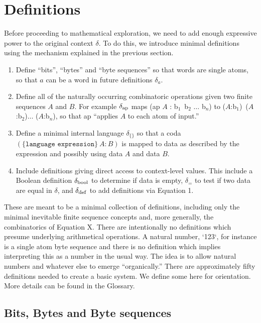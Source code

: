 \documentclass[11pt]{article}
\begin{document}
\section{Definitions}

     Before proceeding to mathematical exploration, we need to add enough expressive power to the original context $\delta$.  To do this, 
we introduce minimal definitions using the mechanism explained in the previous section.  

\begin{enumerate}
\item {Define ``bits'', ``bytes'' and ``byte sequences'' so that words are single atoms, so that $a$ can be a word in future definitions $\delta_a$.}
\item {Define all of the naturally occurring combinatoric operations given two finite sequences $A$ and $B$.  For example $\delta_{\rm ap}$
maps (ap $A$ : b$_1$\ b$_2$ $\dots$ b$_n$) to ($A$:b$_1$)\ ($A$:b$_2$)$\dots$ ($A$:b$_n$), so that ap ``applies $A$ to each atom of input.'' }
\item {Define a minimal internal language $\delta_{\{\}}$ so that a coda $(\{\texttt{language expression}\}\ A : B)$ is mapped to data as described by 
the expression and possibly using data $A$ and data $B$.}
\item {Include definitions giving direct access to context-level values.  This include a Boolean definition $\delta_{\rm bool}$ to determine if data is empty, 
$\delta_{=}$ to test if two data are equal in $\delta$, and $\delta_{\rm def}$ to add definitions via Equation 1.} 
\end{enumerate}
These are meant to be a minimal collection of definitions, including only the minimal inevitable finite sequence concepts and, more generally, 
the combinatorics of Equation X.  There are intentionally no definitions which presume underlying arithmetical operations.  A natural number, 
`123`, for instance is a single atom byte sequence and there is no definition which implies interpreting this as a number in the usual way.  The idea is
to allow natural numbers and whatever else to emerge ``organically.'' 
There are approximately fifty definitions needed to create a basic system.  We define some here for orientation.  More details can be found in the Glossary.  

\subsection{Bits, Bytes and Byte sequences}
\end{document}
